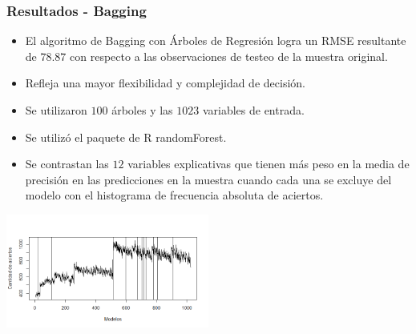 \documentclass{beamer}
\begin{document}
\begin{frame}[t]
\frametitle{Resultados - Bagging}
\vfill
\begin{itemize}
\item
El algoritmo de Bagging con Árboles de Regresión logra un RMSE resultante de $78.87$ con respecto a las observaciones de testeo de la muestra original. 
\item
Refleja una mayor flexibilidad y complejidad de decisión.
\item
Se utilizaron $100$ árboles y las $1023$ variables de entrada.
\item
Se utilizó el paquete de R randomForest.
\item
Se contrastan las $12$ variables explicativas que tienen más peso en la media de precisión en las predicciones en la muestra cuando cada una se excluye del modelo con el histograma de frecuencia absoluta de aciertos. 
\end{itemize}

\centering
\includegraphics[width=0.5\textwidth]{aciertoBagging}
\vfill
\end{frame}
\end{document}
